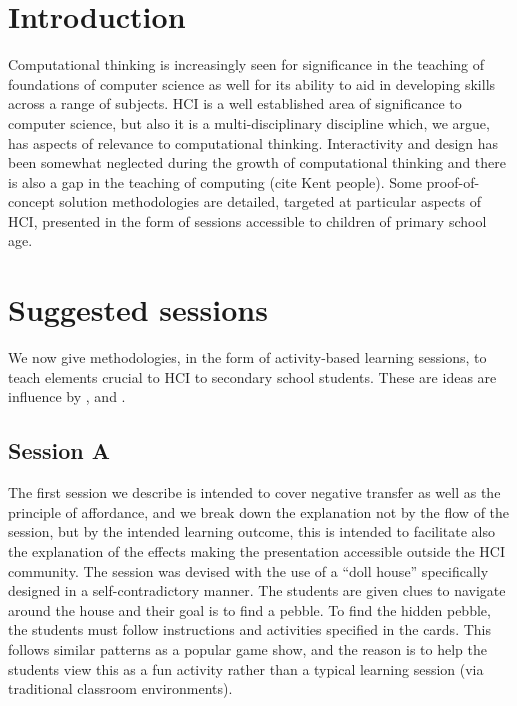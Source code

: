\documentclass{sig-alternate}
\begin{document}
\section{Introduction}

Computational thinking is increasingly seen for significance in the
teaching of foundations of computer science as well for its ability to
aid in developing skills across a range of subjects.  HCI is a well
established area of significance to computer science, but also it is a
multi-disciplinary discipline which, we argue, has aspects of
relevance to computational thinking. Interactivity and design has been
somewhat neglected during the growth of computational thinking and
there is also a gap in the teaching of computing (cite Kent
people). Some proof-of-concept solution methodologies are detailed,
targeted at particular aspects of HCI, presented in the form of
sessions accessible to children of primary school age.

\section{Suggested sessions}

We now give methodologies, in the form of activity-based learning
sessions, to teach elements crucial to HCI to secondary school
students. These are ideas are influence by \cite{norman2002design},
\cite{rogers2011interaction} and \cite{shneiderman1986designing}.

\subsection{Session A}

The first session we describe is intended to cover negative transfer
as well as the principle of affordance, and we break down the
explanation not by the flow of the session, but by the intended
learning outcome, this is intended to facilitate also the explanation
of the effects making the presentation accessible outside the HCI
community. The session was devised with the use of a ``doll house''
specifically designed in a self-contradictory manner. The students are
given clues to navigate around the house and their goal is to find a
pebble. To find the hidden pebble, the students must follow
instructions and activities specified in the cards. This follows
similar patterns as a popular game show, and the reason is to help the
students view this as a fun activity rather than a typical learning
session (via traditional classroom environments).
\end{document}
